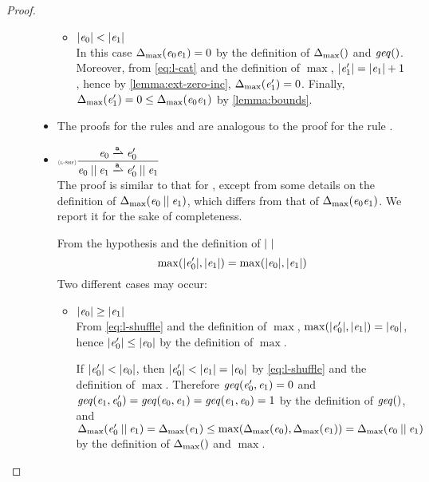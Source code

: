 \begin{proof}
\begin{description}
\begin{itemize}
\begin{itemize}
           \item ${\mid}{\mathit {e}_0}{\mid}<{\mid}{\mathit {e}_1}{\mid}$\\
                 In this case ${\Delta_{\max}}({\mathit {e}_0\mathit {e}_1})=0$ by the definition of ${\Delta_{\max}}({})$ and $\mathit{geq}()$. Moreover, from \cref{eq:l-cat} and the definition of $\max$, ${\mid}{\mathit {e}_1'}{\mid}={\mid}{\mathit {e}_1}{\mid}+1$, hence  by \cref{lemma:ext-zero-inc}, ${\Delta_{\max}}({\mathit {e}_1'})=0$. Finally,
                 ${\Delta_{\max}}({\mathit {e}_1'})=0\leq{\Delta_{\max}}({\mathit {e}_0\mathit {e}_1})$ by \cref{lemma:bounds}.
          \end{itemize}

    \item The proofs for the rules  and  are analogous to the proof for the rule .
    \item $\Rule{l-shf}{\re_0\parDer{\sym}\re'_0}{\re_0\shuffleop\re_1\parDer{\sym}\re'_0\shuffleop\re_1}{}$\\[2ex]
          The proof is similar to that for , except from some details on the definition of ${\Delta_{\max}}({\mathit {e}_0\mathbin{||}\mathit {e}_1})$, which differs from that of ${\Delta_{\max}}({\mathit {e}_0\mathit {e}_1})$. We report it for the sake of completeness.

          From the hypothesis and the definition of ${\mid}{\ }{\mid}$
          \begin{equation}
           \label{eq:l-shuffle}
           \max({\mid}{\mathit {e}_0'}{\mid},{\mid}{\mathit {e}_1}{\mid})=\max({\mid}{\mathit {e}_0}{\mid},{\mid}{\mathit {e}_1}{\mid})
          \end{equation}
          Two different cases may occur:
          \begin{itemize}
           \item ${\mid}{\mathit {e}_0}{\mid}\geq{\mid}{\ensuremath{\mathit {e}}_1}{\mid}$\\
                 From \cref{eq:l-shuffle} and the definition of $\max$, $\max({\mid}{\mathit {e}_0'}{\mid},{\mid}{\mathit {e}_1}{\mid})={\mid}{\mathit {e}_0}{\mid}$, hence ${\mid}{\mathit {e}_0'}{\mid}\leq{\mid}{\ensuremath{\mathit {e}}_0}{\mid}$ by the definition of $\max$.

                 If ${\mid}{\mathit {e}_0'}{\mid}<{\mid}{\mathit {e}_0}{\mid}$, then ${\mid}{\mathit {e}_0'}{\mid}<{\mid}{\mathit {e}_1}{\mid}={\mid}{\mathit {e}_0}{\mid}$ by \cref{eq:l-shuffle} and the definition of $\max$. Therefore $\mathit{geq}({\mathit {e}_0'},{\mathit {e}_1})= 0$ and $\mathit{geq}({\mathit {e}_1},{\mathit {e}_0'})=\mathit{geq}({\mathit {e}_0},{\mathit {e}_1})=\mathit{geq}({\mathit {e}_1},{\mathit {e}_0})=1$ by the definition of $\mathit{geq}()$, and
                 ${\Delta_{\max}}({\mathit {e}_0'\mathbin{||}\mathit {e}_1})={\Delta_{\max}}({\mathit {e}_1})\leq\max({\Delta_{\max}}({\mathit {e}_0}),{\Delta_{\max}}({\mathit {e}_1}))={\Delta_{\max}}({\mathit {e}_0\mathbin{||}\mathit {e}_1})$ by the definition of ${\Delta_{\max}}({})$ and $\max$.



\end{itemize}
\end{itemize}
\end{description}
\end{proof}
